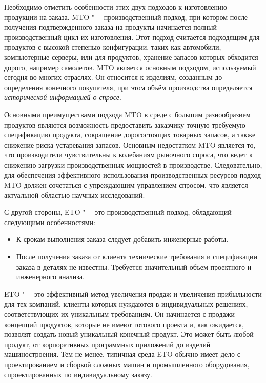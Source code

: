 Необходимо отметить особенности этих двух подходов к изготовлению продукции на заказа. MTO "--- производственный подход, при котором после получения подтвержденного заказа на продукты начинается полный производственный цикл их изготовления. Этот подход считается подходящим для продуктов с высокой степенью конфигурации, таких как автомобили, компьютерные серверы, или для продуктов, хранение запасов которых обходится дорого, например самолетов. MTO является основным подходом, используемый сегодня во многих отраслях. Он относится к изделиям, созданным до определения конечного покупателя, при этом объём производства определяется \textit{исторической информацией о спросе}.

Основными преимуществами подхода MTO в среде с большим разнообразием продуктов являются возможность предоставить заказчику точную требуемую спецификацию продукта, сокращение дорогостоящих товарных запасов, а также снижение риска устаревания запасов.
Основным недостатком MTO является то, что производители чувствительны к колебаниям рыночного спроса, что ведет к снижению загрузки производственных мощностей в производстве. Следовательно, для обеспечения эффективного использования производственных ресурсов подход MTO должен сочетаться с упреждающим управлением спросом, что является актуальной областью научных исследований.

С другой стороны, ETO "--- это производственный подход, обладающий следующими особенностями:

\begin{itemize}
	\item К срокам выполнения заказа следует добавить инженерные работы.
	\item После получения заказа от клиента технические требования и спецификации заказа в деталях не известны. Требуется значительный объем проектного и инженерного анализа.
\end{itemize}

ETO "--- это эффективный метод увеличения продаж и увеличения прибыльности для тех компаний, клиенты которых нуждаются в индивидуальных решениях, соответствующих их уникальным требованиям. Он начинается с продажи концепций продуктов, которые не имеют готового проекта и, как ожидается, позволят создать новый уникальный конечный продукт. Это может быть любой продукт, от корпоративных программных приложений до изделий машиностроения. Тем не менее, типичная среда ETO обычно имеет дело с проектированием и сборкой сложных машин и промышленного оборудования, спроектированных по индивидуальному заказу.

